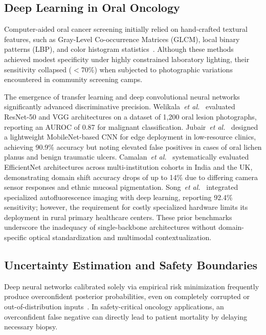 \documentclass[journal]{IEEEtran}
\begin{document}
\subsection{Deep Learning in Oral Oncology}
Computer-aided oral cancer screening initially relied on hand-crafted textural features, such as Gray-Level Co-occurrence Matrices (GLCM), local binary patterns (LBP), and color histogram statistics~\cite{vanderwaal2020screening}. Although these methods achieved modest specificity under highly constrained laboratory lighting, their sensitivity collapsed ($<$70\%) when subjected to photographic variations encountered in community screening camps.

The emergence of transfer learning and deep convolutional neural networks significantly advanced discriminative precision. Welikala~\textit{et al.}~\cite{welikala2020automated} evaluated ResNet-50 and VGG architectures on a dataset of 1{,}200 oral lesion photographs, reporting an AUROC of 0.87 for malignant classification. Jubair~\textit{et al.}~\cite{jubair2022lightweight} designed a lightweight MobileNet-based CNN for edge deployment in low-resource clinics, achieving 90.9\% accuracy but noting elevated false positives in cases of oral lichen planus and benign traumatic ulcers. Camalan~\textit{et al.}~\cite{camalan2021generalization} systematically evaluated EfficientNet architectures across multi-institution cohorts in India and the UK, demonstrating domain shift accuracy drops of up to 14\% due to differing camera sensor responses and ethnic mucosal pigmentation. Song~\textit{et al.}~\cite{song2023fluorescence} integrated specialized autofluorescence imaging with deep learning, reporting 92.4\% sensitivity; however, the requirement for costly specialized hardware limits its deployment in rural primary healthcare centers. These prior benchmarks underscore the inadequacy of single-backbone architectures without domain-specific optical standardization and multimodal contextualization.

\subsection{Uncertainty Estimation and Safety Boundaries}
Deep neural networks calibrated solely via empirical risk minimization frequently produce overconfident posterior probabilities, even on completely corrupted or out-of-distribution inputs~\cite{guo2017calibration}. In safety-critical oncology applications, an overconfident false negative can directly lead to patient mortality by delaying necessary biopsy.
\end{document}
